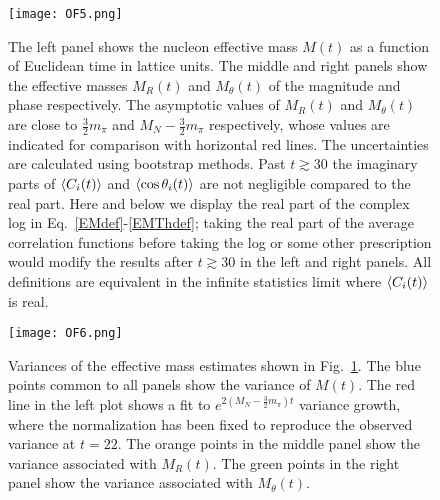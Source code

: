 %
\begin{figure}
  \centering
  \texttt{[image: OF5.png]}
  \caption{
  The left panel shows the nucleon effective mass $M(t)$ as a function of Euclidean time in lattice units. 
  The middle and right panels show the effective masses $M_R(t)$ and $M_\theta(t)$ of the magnitude and  
  phase respectively. 
  The asymptotic values of $M_R(t)$ and $M_\theta(t)$ are close to $\frac{3}{2}m_\pi$ and $M_N - \frac{3}{2}m_\pi$ respectively, whose values are indicated for comparison with horizontal red lines. 
  The uncertainties are calculated  using bootstrap methods.
  Past $t\gtrsim 30$ the imaginary parts of $\left< C_i(t) \right>$ and $\left< \cos\theta_i(t) \right>$ are not negligible compared to the real part.
  Here and below we display the real part of the complex log in Eq.~\eqref{EMdef}-\eqref{EMThdef}; taking the real part of the average correlation functions before taking the log or some other prescription would modify the results after $t\gtrsim 30$ in the left and right panels.
  All definitions are equivalent in the infinite statistics limit where $\left< C_i(t) \right>$ is real.
  }
  \label{RTh_EM}
\end{figure}
%

%
\begin{figure}
  \centering
  \texttt{[image: OF6.png]}
  \caption{
  Variances of the effective mass estimates shown in Fig.~\ref{RTh_EM}. 
  The blue points common to all panels show the variance of $M(t)$. 
  The red line in the left plot shows a fit to $e^{2(M_N - \frac{3}{2}m_\pi)t}$ variance growth, where the normalization has been fixed to reproduce the observed variance at $t=22$. 
  The orange points in the middle panel show the variance associated with $M_R(t)$.
   The green points in the right panel show the variance associated with $M_\theta(t)$.
   }
  \label{RTh_EMErrors}
\end{figure}
%




